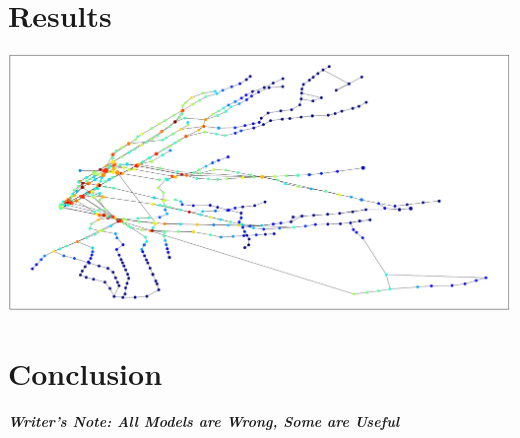 \documentclass[12pt, a4, epsf] {article}
\theoremstyle{plain}
\theoremstyle{definition}
\begin{document}
\section*{Results}
\includegraphics[width = 1.0\textwidth]{Scratch_Visuals/Preliminary_Modeling.png}
\section*{Conclusion}
\textbf{\textit{Writer's Note: All Models are Wrong, Some are Useful}}
\nocite{*}
{}

\end{document}
